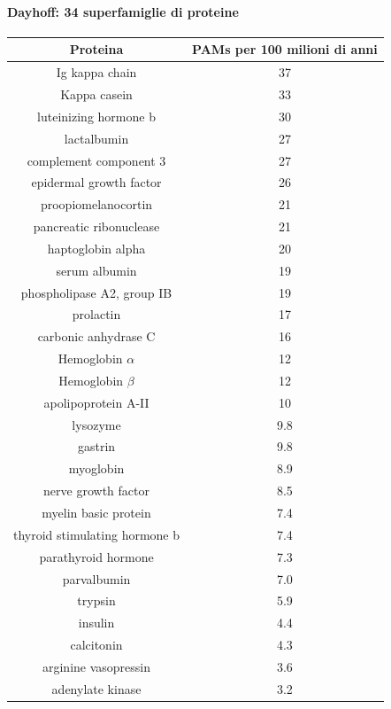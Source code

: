 \documentclass{article}
\begin{document}
\paragraph{Dayhoff: 34 superfamiglie di proteine}
\begin{center}
    \begin{tabular}{c|c}
        \toprule
        \textbf{Proteina} & \textbf{PAMs per 100 milioni di anni}\\
        \midrule
        Ig kappa chain & 37 \\
        Kappa casein & 33 \\
        luteinizing hormone b & 30 \\
        lactalbumin & 27 \\
        complement component 3 & 27 \\
        epidermal growth factor & 26\\
        proopiomelanocortin & 21\\
        pancreatic ribonuclease & 21 \\
        haptoglobin alpha & 20 \\
        serum albumin & 19 \\
        phospholipase A2, group IB & 19 \\
        prolactin & 17 \\
        carbonic anhydrase C & 16 \\
        Hemoglobin $\alpha$ & 12\\
        Hemoglobin $\beta$ & 12 \\
        apolipoprotein A-II & 10\\
        lysozyme & 9.8 \\
        gastrin & 9.8 \\
        myoglobin & 8.9 \\
        nerve growth factor & 8.5 \\
        myelin basic protein & 7.4 \\
        thyroid stimulating hormone b & 7.4 \\
        parathyroid hormone & 7.3 \\
        parvalbumin & 7.0 \\
        trypsin & 5.9 \\
        insulin & 4.4 \\
        calcitonin & 4.3 \\
        arginine vasopressin & 3.6 \\
        adenylate kinase & 3.2 \\

\end{tabular}
\end{center}
\end{document}
